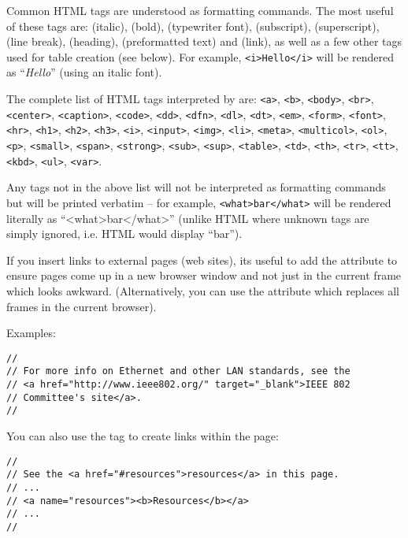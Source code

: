 Common HTML tags are understood as formatting commands.
The most useful of these tags are:  (italic),
 (bold),  (typewriter font),
 (subscript),  (superscript),
 (line break),  (heading),
 (preformatted text) and  (link),
as well as a few other tags used for table creation (see below).
For example, \texttt{<i>Hello</i>} will be rendered as ``\textit{Hello}''
(using an italic font).

The complete list of HTML tags interpreted by  are:
\texttt{<a>}, \texttt{<b>}, \texttt{<body>}, \texttt{<br>}, \texttt{<center>},
\texttt{<caption>}, \texttt{<code>}, \texttt{<dd>}, \texttt{<dfn>}, \texttt{<dl>},
\texttt{<dt>}, \texttt{<em>}, \texttt{<form>}, \texttt{<font>}, \texttt{<hr>},
\texttt{<h1>}, \texttt{<h2>}, \texttt{<h3>}, \texttt{<i>}, \texttt{<input>}, \texttt{<img>},
\texttt{<li>}, \texttt{<meta>}, \texttt{<multicol>}, \texttt{<ol>}, \texttt{<p>}, \texttt{<small>},
\texttt{<span>}, \texttt{<strong>},
\texttt{<sub>}, \texttt{<sup>}, \texttt{<table>}, \texttt{<td>}, \texttt{<th>}, \texttt{<tr>},
\texttt{<tt>}, \texttt{<kbd>}, \texttt{<ul>}, \texttt{<var>}.

Any tags not in the above list will not be interpreted as formatting commands
but will be printed verbatim -- for example, \texttt{<what>bar</what>}
will be rendered literally as ``<what>bar</what>'' (unlike HTML where
unknown tags are simply ignored, i.e. HTML would display ``bar'').

If you insert links to external pages (web sites), its useful to add
the  attribute to ensure pages come up in a new
browser window and not just in the current frame which looks awkward.
(Alternatively, you can use the  attribute
which replaces all frames in the current browser).

Examples:

\begin{verbatim}
//
// For more info on Ethernet and other LAN standards, see the
// <a href="http://www.ieee802.org/" target="_blank">IEEE 802
// Committee's site</a>.
//
\end{verbatim}

You can also use the  tag to create links within the page:

\begin{verbatim}
//
// See the <a href="#resources">resources</a> in this page.
// ...
// <a name="resources"><b>Resources</b></a>
// ...
//
\end{verbatim}

